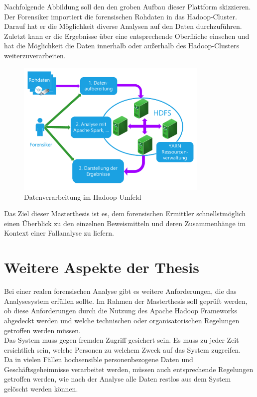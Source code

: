 \noindent
Nachfolgende Abbildung soll den den groben Aufbau dieser Plattform skizzieren. Der Forensiker importiert die forensischen Rohdaten in das Hadoop-Cluster. Darauf hat er die Möglichkeit diverse Analysen auf den Daten durchzuführen. Zuletzt kann er die Ergebnisse über eine entsprechende Oberfläche einsehen und hat die Möglichkeit die Daten innerhalb oder außerhalb des Hadoop-Clusters weiterzuverarbeiten.\\

\begin{figure}[ht]
  \centering
  \includegraphics[width=0.82\textwidth]{./resource/Hadoop-Struktur.pdf}
  \caption{Datenverarbeitung im Hadoop-Umfeld}
\end{figure}

\noindent
Das Ziel dieser Masterthesis ist es, dem forensischen Ermittler schnellstmöglich einen Überblick zu den einzelnen Beweismitteln und deren Zusammenhänge im Kontext einer Fallanalyse zu liefern. 

\section{Weitere Aspekte der Thesis}
Bei einer realen forensischen Analyse gibt es weitere Anforderungen, die das Analysesystem erfüllen sollte. Im Rahmen der Masterthesis soll geprüft werden, ob diese Anforderungen durch die Nutzung des Apache Hadoop Frameworks abgedeckt werden und welche technischen oder organisatorischen Regelungen getroffen werden müssen.\\
Das System muss gegen fremden Zugriff gesichert sein. Es muss zu jeder Zeit ersichtlich sein, welche Personen zu welchem Zweck auf das System zugreifen.\\

\noindent
Da in vielen Fällen hochsensible personenbezogene Daten und Geschäftsgeheimnisse verarbeitet werden, müssen auch entsprechende Regelungen getroffen werden, wie nach der Analyse alle Daten restlos aus dem System gelöscht werden können.\\

